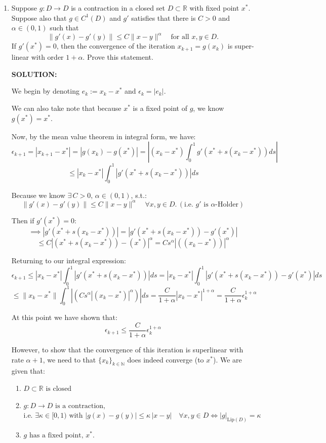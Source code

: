 \documentclass[]{article}
\begin{document}
\begin{enumerate}
\item Suppose $g: D \to D$ is a contraction in a closed set $D \subset \mathbb{R}$ with fixed point $x^*$. Suppose also that $g \in C^1(D)$ and $g'$ satisfies that there is $C > 0$ and $\alpha \in (0,1)$ such that 
$$
\| g'(x) - g'(y) \| \leq C \|x - y\|^{\alpha} \quad \text{for all } x, y \in D.
$$
If $g'(x^*) = 0$, then the convergence of the iteration $x_{k+1} = g(x_k)$ is super-linear with order $1 + \alpha$. Prove this statement.

\noindent \textbf{SOLUTION:}

We begin by denoting $e_k := x_k - x^*$ and $\epsilon_k = |e_k|$.

We can also take note that because $x^*$ is a fixed point of $g$, we know $g(x^*) = x^*.$

Now, by the mean value theorem in integral form, we have:
\[
{\epsilon}_{k+1} = |x_{k+1} - x^*| = \left|g(x_k)-g(x^*)\right| = \left|(x_k-x^*)\int_0^1 g'(x^*+s(x_k-x^*))ds \right|
\]
\[
\leq |x_k-x^*| \int_0^1 \left| g'(x^*+s(x_k-x^*))  \right|ds
\]

Because we know $\exists\,C>0,\,\alpha\in(0,1)$, s.t.:
$$
\| g'(x) - g'(y) \| \leq C \|x - y\|^{\alpha} \quad \forall x, y \in D. \, (\text{i.e. } g' \text{ is } \alpha\text{-Holder})
$$

Then if $g'(x^*) = 0:$
\[
\implies \left| g'(x^*+s(x_k-x^*))  \right|= \left| g'(x^*+s(x_k-x^*))  - g'(x^*)\right|
\] 
\[
\leq C |\left(x^*+s(x_k-x^*)\right) - \left(x^*\right)|^{\alpha} =  Cs^{\alpha} |\left((x_k-x^*)\right) |^{\alpha}
\]

Returning to our integral expression:
\[
{\epsilon}_{k+1} \leq |x_k-x^*| \int_0^1 \left| g'(x^*+s(x_k-x^*))  \right|ds =|x_k-x^*| \int_0^1 \left| g'(x^*+s(x_k-x^*))  - g'(x^*)\right|ds 
\]
\[
\leq \|x_k-x^*\| \int_0^1 \left| \left(Cs^{\alpha} |\left(x_k-x^*\right) |^{\alpha}\right)\right|ds = \frac{C}{1+\alpha}|x_k-x^*|^{1+\alpha} = \frac{C}{1+\alpha} \epsilon_k^{1+\alpha}
\]

At this point we have shown that:
\[
\epsilon_{k+1} \leq \frac{C}{1+\alpha} \epsilon_k^{1+\alpha}
\]

However, to show that the convergence of this iteration is superlinear with rate $\alpha+1$, we need to that $\{x_k\}_{k\in \mathbb{N}}$ does indeed converge (to $x^*$). We are given that:
\begin{enumerate}
 \item $D \subset \mathbb{R} \text{ is closed }   $
  \item  $g:D\to D \text{ is a contraction,}$
 \subitem \hspace{-0.8cm} $ \text{i.e.  } \exists \kappa \in [0,1) \text{ with } |g(x)-g(y)|\le \kappa\,|x-y| \quad \forall x,y\in D \iff |g|_{\text{Lip}(D)} = \kappa\text{}$
  \item $g \text{ has a fixed point, }x^*.$
\end{enumerate}


\end{enumerate}
\end{document}
